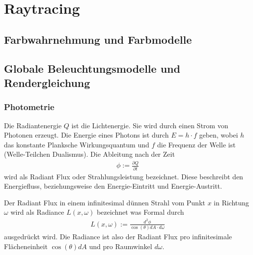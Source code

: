 \section{Raytracing}

\subsection{Farbwahrnehmung und Farbmodelle}
\subsection{Globale Beleuchtungsmodelle und Rendergleichung}
\subsubsection{Photometrie}
Die Radiantenergie $Q$ ist die Lichtenergie. Sie wird durch einen Strom von Photonen erzeugt. Die Energie eines Photons ist 
durch $E=h \cdot f$ geben, wobei $h$ das konstante Planksche Wirkungsquantum und $f$ die Frequenz der Welle ist (Welle-Teilchen Dualismus).  
Die Ableitung nach der Zeit
\begin{align}
\phi := \frac{\partial Q}{\partial t}
\end{align}
wird als Radiant Flux oder Strahlungsleistung bezeichnet. Diese  beschreibt den Energiefluss, beziehungsweise den Energie-Eintritt und Energie-Austritt.

Der Radiant Flux in einem infinitesimal dünnen Strahl vom Punkt $x$ in Richtung $\omega$ wird als Radiance $L(x, \omega)$ bezeichnet was  Formal durch
\begin{align}
L(x, \omega) := \frac{d^2 \phi}{\cos(\theta) dA \cdot d\omega}
\end{align}
ausgedrückt wird. Die Radiance ist also der Radiant Flux pro infinitesimale Flächeneinheit $\cos(\theta) dA$ und pro  Raumwinkel $d \omega$.
